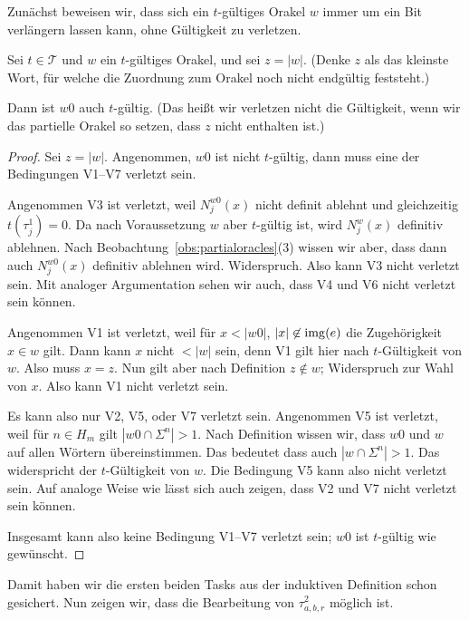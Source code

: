 Zunächst beweisen wir, dass sich ein $t$-gültiges Orakel $w$ immer um ein Bit verlängern lassen kann, ohne Gültigkeit zu verletzen.

\begin{lemma}\label{claim:myoracle-up-extension}
    Sei $t\in\mathcal T$ und $w$ ein $t$-gültiges Orakel, und sei $z=|w|$. 
    (Denke $z$ als das kleinste Wort, für welche die Zuordnung zum Orakel noch nicht endgültig feststeht.)

    Dann ist $w0$ auch $t$-gültig. (Das heißt wir verletzen nicht die Gültigkeit, wenn wir das partielle Orakel so setzen, dass $z$ nicht enthalten ist.)
\end{lemma}
\begin{proof}
    Sei $z=|w|$. 
    Angenommen, $w0$ ist nicht $t$-gültig, dann muss eine der Bedingungen V1–V7 verletzt sein.

    Angenommen V3 ist verletzt, weil $N_j^{w0}(x)$ nicht definit ablehnt und gleichzeitig $t(\tau_j^1)=0$. Da nach Voraussetzung $w$ aber $t$-gültig ist, wird $N_j^{w}(x)$ definitiv ablehnen.
    Nach Beobachtung~\ref{obs:partialoracles}(3) wissen wir aber, dass dann auch $N_j^{w0}(x)$ definitiv ablehnen wird. Widerspruch.
    Also kann V3 nicht verletzt sein. Mit analoger Argumentation sehen wir auch, dass V4 und V6 nicht verletzt sein können.

    Angenommen V1 ist verletzt, weil für $x<|w0|$, $|x|\not\in\operatorname{img}(e)$ die Zugehörigkeit $x\in w$ gilt. Dann kann $x$ nicht $<|w|$ sein, denn V1 gilt hier nach $t$-Gültigkeit von $w$. Also muss $x=z$.
    Nun gilt aber nach Definition $z\not\in w$; Widerspruch zur Wahl von $x$. Also kann V1 nicht verletzt sein.

    Es kann also nur V2, V5, oder V7 verletzt sein.
    Angenommen V5 ist verletzt, weil für $n\in H_m$ gilt $|w0\cap\Sigma^n|> 1$.
    Nach Definition wissen wir, dass $w0$ und $w$ auf allen Wörtern übereinstimmen.
    Das bedeutet dass auch $|w\cap\Sigma^n|>1$.
    Das widerspricht der $t$-Gültigkeit von $w$.
    Die Bedingung V5 kann also nicht verletzt sein.
    Auf analoge Weise wie lässt sich auch zeigen, dass V2 und V7 nicht verletzt sein können.

    Insgesamt kann also keine Bedingung V1–V7 verletzt sein; $w0$ ist $t$-gültig wie gewünscht.
\end{proof}

Damit haben wir die ersten beiden Tasks aus der induktiven Definition schon gesichert. Nun zeigen wir, dass die Bearbeitung von $\tau^2_{a,b,r}$ möglich ist.

